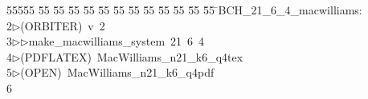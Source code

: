 %
%
\begin{tabbing}
55555 \= 55 \= 55 \= 55 \= 55 \= 55 \= 55 \= 55 \= 55 \= 55 \= 55 \= 55 \= 55 \= \>BCH\_21\_6\_4\_macwilliams:\\[0pt]
2\>$\triangleright$\>(ORBITER)\ v\ 2\ \\[0pt]
3\>$\triangleright$\>$\triangleright$\>make\_macwilliams\_system\ 21\ 6\ 4\\[0pt]
4\>$\triangleright$\>(PDFLATEX)\ MacWilliams\_n21\_k6\_q4tex\\[0pt]
5\>$\triangleright$\>(OPEN)\ MacWilliams\_n21\_k6\_q4pdf\\[0pt]
6\>\end{tabbing}

